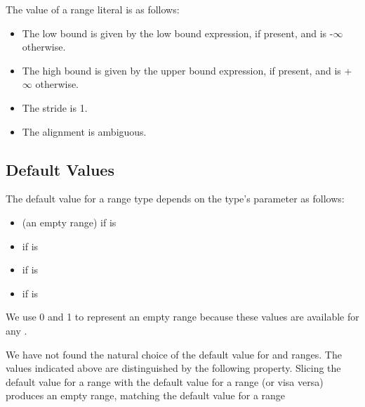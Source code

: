 The value of a range literal is as follows:

\begin{itemize}

\item The low bound is given by the low bound expression,
if present, and is -$\infty$ otherwise.

\item The high bound is given by the upper bound expression,
if present, and is +$\infty$ otherwise.

\item The stride is 1.

\item The alignment is ambiguous.

\end{itemize}


\subsection{Default Values}
\label{Range_Default_Values}

The default value for a range type depends on the type's
 parameter as follows:

\begin{itemize}

\item {} (an empty range) if  is 

\item {} if  is 

\item {} if  is 

\item {} if  is 

\end{itemize}

\begin{rationale}
We use 0 and 1 to represent an empty range because these values
are available for any .

We have not found the natural choice of the default value for
 and  ranges.
The values indicated above are distinguished by the following property.
Slicing the default value for a  range with
the default value for a  range (or visa versa)
produces an empty range, matching the default value for a
 range
\end{rationale}


